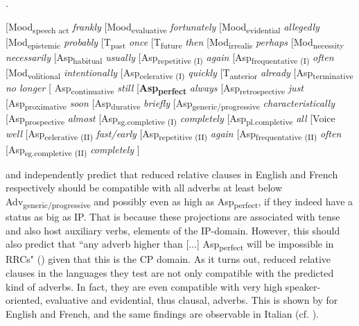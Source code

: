 \ex.
\raggedright
[Mood\textsubscript{speech act} \textit{frankly} [Mood\textsubscript{evaluative} \textit{fortunately} [Mood\textsubscript{evidential} \textit{allegedly} [Mod\textsubscript{epistemic} \textit{probably} [T\textsubscript{past} \textit{once} [T\textsubscript{future} \textit{then} [Mod\textsubscript{irrealis} \textit{perhaps} [Mod\textsubscript{necessity} \textit{necessarily} [Asp\textsubscript{habitual} \textit{usually} [Asp\textsubscript{repetitive (I)} \textit{again} [Asp\textsubscript{frequentative (I)} \textit{often} [Mod\textsubscript{volitional} \textit{intentionally} [Asp\textsubscript{celerative (I)} \textit{quickly} [T\textsubscript{anterior} \textit{already} [Asp\textsubscript{terminative} \textit{no longer} [ Asp\textsubscript{continuative} \textit{still} [\textbf{Asp\textsubscript{perfect}} \textit{always} [Asp\textsubscript{retrospective} \textit{just} [Asp\textsubscript{proximative} \textit{soon} [Asp\textsubscript{durative} \textit{briefly} [Asp\textsubscript{generic/progressive} \textit{characteristically} [Asp\textsubscript{prospective} \textit{almost} [Asp\textsubscript{sg.completive (I)} \textit{completely} [Asp\textsubscript{pl.completive} \textit{all} [Voice \textit{well} [Asp\textsubscript{celerative (II)} \textit{fast/early} [Asp\textsubscript{repetitive (II)} \textit{again} [Asp\textsubscript{frequentative (II)} \textit{often} [Asp\textsubscript{sg.completive (II)} \textit{completely} ]

\citet{douglas:2016:syntactic} and \citet{harwood:2018:rrc} independently predict that reduced relative clauses in  English and  French respectively should be compatible with all adverbs at least below Adv\textsubscript{generic/progressive} and possibly even as high as Asp\textsubscript{perfect}, if they indeed have a status as big as IP. That is because these projections are associated with tense and also host auxiliary verbs, elements of the IP-domain. However, this should also predict that ``any adverb higher than [...] Asp\textsubscript{perfect} will be impossible in RRCs" (\citealt[223]{douglas:2016:syntactic}) given that this is the CP domain. As it turns out, reduced relative clauses in the languages they test are not only compatible with the predicted kind of adverbs. In fact, they are even compatible with very high speaker-oriented, evaluative and evidential, thus clausal, adverbs. This is shown by \citet[226–230; 239–245]{douglas:2016:syntactic} for English and French, and the same findings are observable in  Italian (cf. \citealt[214]{cinque:2020:relcl}).

